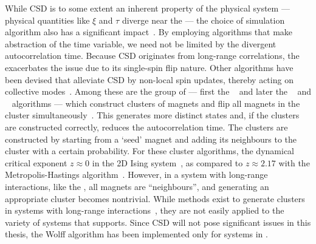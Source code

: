 While CSD is to some extent an inherent property of the physical system --- physical quantities like $\xi$ and $\tau$ diverge near the  --- the choice of simulation algorithm also has a significant impact~\cite{PhD_Reynal}.
By employing algorithms that make abstraction of the time variable, we need not be limited by the divergent autocorrelation time. %
Because CSD originates from long-range correlations, the  exacerbates the issue due to its single-spin flip nature.
Other algorithms have been devised that alleviate CSD by non-local spin updates, thereby acting on collective modes~\cite{BeatCriticalSlowingDown1990}.
Among these are the group of  --- first the ~\cite{SwendsenWang} and later the ~\cite{niedermayer1988general} and ~\cite{Wolff} algorithms --- which construct clusters of magnets and flip all magnets in the cluster simultaneously~\cite{CompStatPhys}. %
This generates more distinct states and, if the clusters are constructed correctly, reduces the autocorrelation time.
The clusters are constructed by starting from a `seed' magnet and adding its neighbours to the cluster with a certain probability.
For these cluster algorithms, the dynamical critical exponent $z \approx 0$ in the 2D  Ising system~\cite{NumericalDynamicalNiedermayer}, as compared to $z\approx2.17$ with the Metropolis-Hastings algorithm~\cite{DynamicExponentMetropolis}.
However, in a system with long-range interactions, like the , all magnets are ``neighbours'', and generating an appropriate cluster becomes nontrivial.
While methods exist to generate clusters in systems with long-range interactions~\cite{MC_spinLongRange}, they are not easily applied to the variety of systems that \hotspice supports.
Since CSD will not pose significant issues in this thesis, the Wolff algorithm has been implemented only for  systems in \hotspice.

